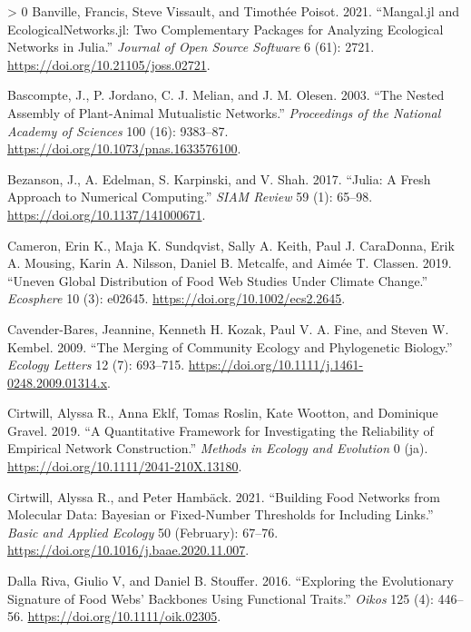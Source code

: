 \documentclass[11pt]{article}
\newlength{\cslhangindent}
\newenvironment{CSLReferences}[3] %
 {%
  \setlength{\parindent}{0pt}
  \ifodd #1 \everypar{\setlength{\hangindent}{\cslhangindent}}\ignorespaces\fi
  \ifnum #2 > 0
  \setlength{\parskip}{#2\baselineskip}
  \fi
 }%
 {}
\begin{document}
\hypertarget{refs}{}
\begin{CSLReferences}{1}{0}
\leavevmode\hypertarget{ref-Banville2021ManJl}{}%
Banville, Francis, Steve Vissault, and Timothée Poisot. 2021.
{``Mangal.jl and EcologicalNetworks.jl: Two Complementary Packages for
Analyzing Ecological Networks in Julia.''} \emph{Journal of Open Source
Software} 6 (61): 2721. \url{https://doi.org/10.21105/joss.02721}.

\leavevmode\hypertarget{ref-Bascompte2003NesAss}{}%
Bascompte, J., P. Jordano, C. J. Melian, and J. M. Olesen. 2003. {``The
Nested Assembly of Plant-Animal Mutualistic Networks.''}
\emph{Proceedings of the National Academy of Sciences} 100 (16):
9383--87. \url{https://doi.org/10.1073/pnas.1633576100}.

\leavevmode\hypertarget{ref-Bezanson2017JulFre}{}%
Bezanson, J., A. Edelman, S. Karpinski, and V. Shah. 2017. {``Julia: A
Fresh Approach to Numerical Computing.''} \emph{SIAM Review} 59 (1):
65--98. \url{https://doi.org/10.1137/141000671}.

\leavevmode\hypertarget{ref-Cameron2019UneGlo}{}%
Cameron, Erin K., Maja K. Sundqvist, Sally A. Keith, Paul J. CaraDonna,
Erik A. Mousing, Karin A. Nilsson, Daniel B. Metcalfe, and Aimée T.
Classen. 2019. {``Uneven Global Distribution of Food Web Studies Under
Climate Change.''} \emph{Ecosphere} 10 (3): e02645.
\url{https://doi.org/10.1002/ecs2.2645}.

\leavevmode\hypertarget{ref-Cavender-Bares2009MerCom}{}%
Cavender-Bares, Jeannine, Kenneth H. Kozak, Paul V. A. Fine, and Steven
W. Kembel. 2009. {``The Merging of Community Ecology and Phylogenetic
Biology.''} \emph{Ecology Letters} 12 (7): 693--715.
\url{https://doi.org/10.1111/j.1461-0248.2009.01314.x}.

\leavevmode\hypertarget{ref-Cirtwill2019QuaFra}{}%
Cirtwill, Alyssa R., Anna Eklf, Tomas Roslin, Kate Wootton, and
Dominique Gravel. 2019. {``A Quantitative Framework for Investigating
the Reliability of Empirical Network Construction.''} \emph{Methods in
Ecology and Evolution} 0 (ja).
\url{https://doi.org/10.1111/2041-210X.13180}.

\leavevmode\hypertarget{ref-Cirtwill2021BuiFoo}{}%
Cirtwill, Alyssa R., and Peter Hambäck. 2021. {``Building Food Networks
from Molecular Data: Bayesian or Fixed-Number Thresholds for Including
Links.''} \emph{Basic and Applied Ecology} 50 (February): 67--76.
\url{https://doi.org/10.1016/j.baae.2020.11.007}.

\leavevmode\hypertarget{ref-DallaRiva2016ExpEvo}{}%
Dalla Riva, Giulio V, and Daniel B. Stouffer. 2016. {``Exploring the
Evolutionary Signature of Food Webs' Backbones Using Functional
Traits.''} \emph{Oikos} 125 (4): 446--56.
\url{https://doi.org/10.1111/oik.02305}.


\end{CSLReferences}
\end{document}
